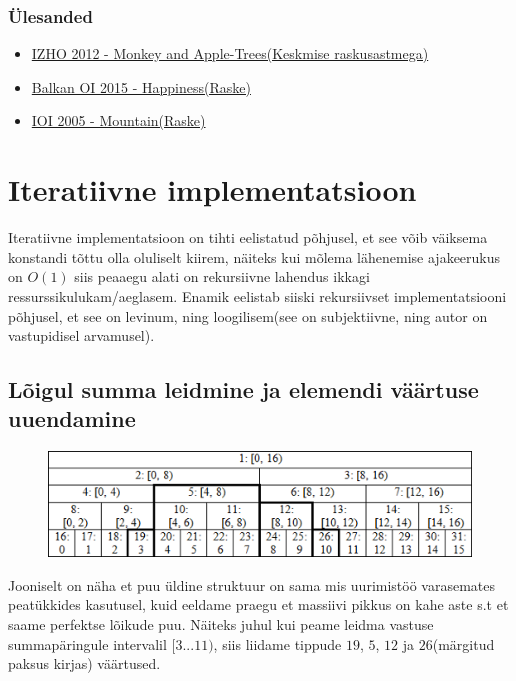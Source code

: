 \documentclass{trkut}
\begin{document}
\subsubsection{Ülesanded}
\begin{itemize}
    \item \href{https://oj.uz/problem/view/IZhO12_apple}{IZHO 2012 - Monkey and Apple-Trees(Keskmise raskusastmega)}
    \item \href{https://oj.uz/problem/view/Balkan15_HAPPINESS}{Balkan OI 2015 - Happiness(Raske)}
    \item \href{https://dmoj.ca/problem/ioi05p3}{IOI 2005 - Mountain(Raske)}
\end{itemize}
\section{Iteratiivne implementatsioon} 
Iteratiivne implementatsioon on tihti eelistatud põhjusel, et see võib väiksema konstandi tõttu olla oluliselt kiirem, näiteks kui mõlema lähenemise ajakeerukus on $O(1)$ siis peaaegu alati on rekursiivne lahendus ikkagi ressurssikulukam/aeglasem.
Enamik eelistab siiski rekursiivset implementatsiooni põhjusel, et see on levinum, ning loogilisem(see on subjektiivne, ning autor on vastupidisel arvamusel).

\subsection{Lõigul summa leidmine ja elemendi väärtuse uuendamine}

\begin{figure}[H]%
    \includegraphics[width=12cm]{LIHTPUU.png}%
    \caption{}%
    \label{joonis}%
\end{figure}
Jooniselt on näha et puu üldine struktuur on sama mis uurimistöö varasemates peatükkides kasutusel, kuid eeldame praegu et massiivi pikkus on kahe aste s.t et saame perfektse lõikude puu. Näiteks juhul kui peame leidma vastuse summapäringule intervalil $[3...11)$, siis liidame tippude $19$, $5$, $12$ ja $26$(märgitud paksus kirjas) väärtused. \parencite{cfpuu}
\end{document}
